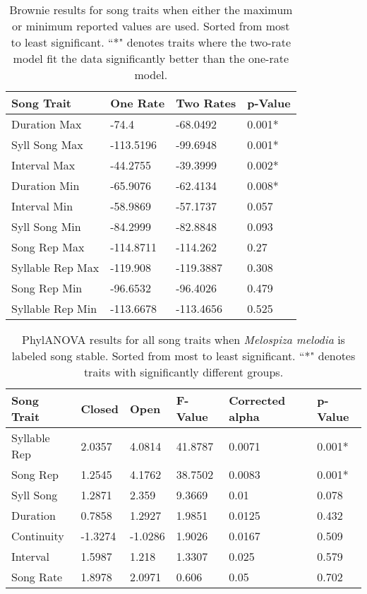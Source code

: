 \documentclass[a4paper,12pt]{article}
\begin{document}
\begin{table}[ht]
\caption{Brownie results for song traits when either the maximum or minimum reported values are used.  Sorted from most to least significant.  ``*" denotes traits where the two-rate model fit the data significantly better than the one-rate model.}
\centering
\begin{tabular}{llll}
    \hline
Song Trait & One Rate & Two Rates & p-Value \\ 
  \hline
Duration Max & -74.4 & -68.0492 & 0.001* \\ 
  Syll Song Max & -113.5196 & -99.6948 & 0.001* \\ 
  Interval Max & -44.2755 & -39.3999 & 0.002* \\ 
  Duration Min & -65.9076 & -62.4134 & 0.008* \\ 
  Interval Min & -58.9869 & -57.1737 & 0.057 \\ 
  Syll Song Min & -84.2999 & -82.8848 & 0.093 \\ 
  Song Rep Max & -114.8711 & -114.262 & 0.27 \\ 
  Syllable Rep Max & -119.908 & -119.3887 & 0.308 \\ 
  Song Rep Min & -96.6532 & -96.4026 & 0.479 \\ 
  Syllable Rep Min & -113.6678 & -113.4656 & 0.525 \\ 
   \hline
\end{tabular}
\end{table}

\begin{table}[ht]
\caption{PhylANOVA results for all song traits when \textit{Melospiza melodia} is labeled song stable.  Sorted from most to least significant.  ``*" denotes traits with significantly different groups.}
\centering
\begin{tabular}{llllll}
  \hline
Song Trait & Closed & Open & F-Value & Corrected alpha & p-Value \\ 
  \hline
Syllable Rep & 2.0357 & 4.0814 & 41.8787 & 0.0071 & 0.001* \\ 
  Song Rep & 1.2545 & 4.1762 & 38.7502 & 0.0083 & 0.001* \\ 
  Syll Song & 1.2871 & 2.359 & 9.3669 & 0.01 & 0.078 \\ 
  Duration & 0.7858 & 1.2927 & 1.9851 & 0.0125 & 0.432 \\ 
  Continuity & -1.3274 & -1.0286 & 1.9026 & 0.0167 & 0.509 \\ 
  Interval & 1.5987 & 1.218 & 1.3307 & 0.025 & 0.579 \\ 
  Song Rate & 1.8978 & 2.0971 & 0.606 & 0.05 & 0.702 \\ 
   \hline
\end{tabular}
\end{table}
\end{document}

